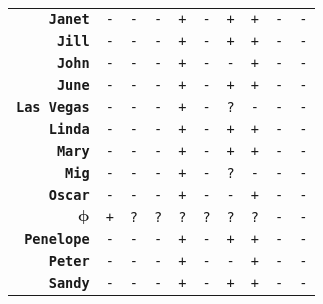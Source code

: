 \documentclass{article}
\begin{document}
\begin{minipage}{\textwidth}
{\begin{tabular}{|r|c|c|c|c|c|c|c|c|c|}
    \textbf{\texttt{Janet}} & \texttt{-}
    & \texttt{-} & \texttt{-}
    & \texttt{+} & \texttt{-}
    & \texttt{+} & \texttt{+}
    & \texttt{-} & \texttt{-} \\
    \textbf{\texttt{Jill}} & \texttt{-}
    & \texttt{-} & \texttt{-}
    & \texttt{+} & \texttt{-}
    & \texttt{+} & \texttt{+}
    & \texttt{-} & \texttt{-} \\
    \textbf{\texttt{John}} & \texttt{-}
    & \texttt{-} & \texttt{-}
    & \texttt{+} & \texttt{-}
    & \texttt{-} & \texttt{+}
    & \texttt{-} & \texttt{-} \\
    \textbf{\texttt{June}} & \texttt{-}
    & \texttt{-} & \texttt{-}
    & \texttt{+} & \texttt{-}
    & \texttt{+} & \texttt{+}
    & \texttt{-} & \texttt{-} \\
    \textbf{\texttt{Las Vegas}} & \texttt{-}
    & \texttt{-} & \texttt{-}
    & \texttt{+} & \texttt{-}
    & \texttt{?} & \texttt{-}
    & \texttt{-} & \texttt{-} \\
    \textbf{\texttt{Linda}} & \texttt{-}
    & \texttt{-} & \texttt{-}
    & \texttt{+} & \texttt{-}
    & \texttt{+} & \texttt{+}
    & \texttt{-} & \texttt{-} \\
    \textbf{\texttt{Mary}} & \texttt{-}
    & \texttt{-} & \texttt{-}
    & \texttt{+} & \texttt{-}
    & \texttt{+} & \texttt{+}
    & \texttt{-} & \texttt{-} \\
    \textbf{\texttt{Mig}} & \texttt{-}
    & \texttt{-} & \texttt{-}
    & \texttt{+} & \texttt{-}
    & \texttt{?} & \texttt{-}
    & \texttt{-} & \texttt{-} \\
    \textbf{\texttt{Oscar}} & \texttt{-}
    & \texttt{-} & \texttt{-}
    & \texttt{+} & \texttt{-}
    & \texttt{-} & \texttt{+}
    & \texttt{-} & \texttt{-} \\
    $\bm{\phi}$ & \texttt{+}
    & \texttt{?} & \texttt{?}
    & \texttt{?} & \texttt{?}
    & \texttt{?} & \texttt{?}
    & \texttt{-} & \texttt{-} \\
    \textbf{\texttt{Penelope}} & \texttt{-}
    & \texttt{-} & \texttt{-}
    & \texttt{+} & \texttt{-}
    & \texttt{+} & \texttt{+}
    & \texttt{-} & \texttt{-} \\
    \textbf{\texttt{Peter}} & \texttt{-}
    & \texttt{-} & \texttt{-}
    & \texttt{+} & \texttt{-}
    & \texttt{-} & \texttt{+}
    & \texttt{-} & \texttt{-} \\
    \textbf{\texttt{Sandy}} & \texttt{-}
    & \texttt{-} & \texttt{-}
    & \texttt{+} & \texttt{-}
    & \texttt{+} & \texttt{+}
    & \texttt{-} & \texttt{-} \\

\end{tabular}}
\end{minipage}
\end{document}
